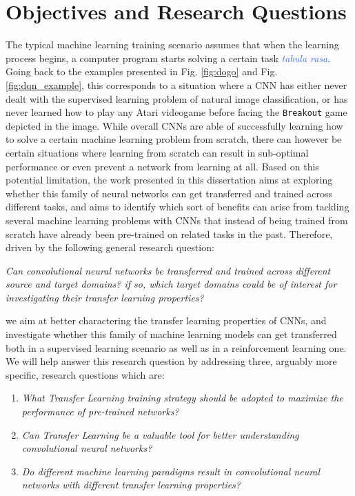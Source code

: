 \section{Objectives and Research Questions}

The typical machine learning training scenario assumes that when the learning process begins, a computer program starts solving a certain task \textcolor{RoyalBlue}{\textit{tabula rasa}}. Going back to the examples presented in Fig. \ref{fig:dogo} and Fig. \ref{fig:dqn_example}, this corresponds to a situation where a CNN has either never dealt with the supervised learning problem of natural image classification, or has never learned how to play any Atari videogame before facing the \texttt{Breakout} game depicted in the image. While overall CNNs are able of successfully learning how to solve a certain machine learning problem from scratch, there can however be certain situations
where learning from scratch can result in sub-optimal performance or even prevent a network from  learning at all. Based on this potential limitation, the work presented in this dissertation aims at exploring whether this family of neural networks can get transferred and trained across different tasks, and aims to identify which sort of benefits can arise from tackling several machine learning problems with CNNs that instead of being trained from scratch have already been pre-trained on related tasks in the past. Therefore, driven by the following general research question:
\begin{center}
	\textit{Can convolutional neural networks be transferred and trained across different source and target domains? if so, which target domains could be of interest for investigating their transfer learning properties?}	
\end{center}    
we aim at better charactering the transfer learning properties of CNNs, and investigate whether this family of machine learning models can get transferred both in a supervised learning scenario as well as in a reinforcement learning one. We will help answer this research question by addressing three, arguably more specific, research questions which are:
\begin{enumerate}
	\item \textit{What Transfer Learning training strategy should be adopted to maximize the performance of pre-trained networks?}

	\item \textit{Can Transfer Learning be a valuable tool for better understanding convolutional neural networks?}
	
	\item \textit{Do different machine learning paradigms result in convolutional neural networks with different transfer learning properties?}
\end{enumerate}



